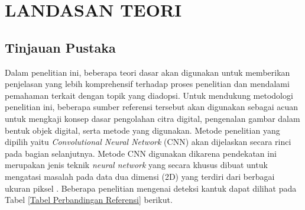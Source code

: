 \chapter{LANDASAN TEORI}

\section{Tinjauan Pustaka}


    Dalam penelitian ini, beberapa teori dasar akan digunakan untuk memberikan penjelasan yang lebih komprehensif terhadap proses penelitian dan mendalami pemahaman terkait dengan topik yang diadopsi. Untuk mendukung metodologi penelitian ini, beberapa sumber referensi tersebut akan digunakan sebagai acuan untuk mengkaji konsep dasar pengolahan citra digital, pengenalan gambar dalam bentuk objek digital, serta metode yang digunakan. Metode penelitian yang dipilih yaitu \textit{Convolutional Neural Network}  (CNN) akan dijelaskan secara rinci pada bagian selanjutnya. Metode CNN digunakan dikarena pendekatan ini merupakan jenis teknik \textit{neural network} yang secara khusus dibuat untuk mengatasi masalah pada data dua dimensi (2D) yang terdiri dari berbagai ukuran piksel \cite{Lindholm2022}. Beberapa penelitian mengenai deteksi kantuk dapat dilihat pada Tabel \ref{Tabel Perbandingan Referensi} berikut.

    

